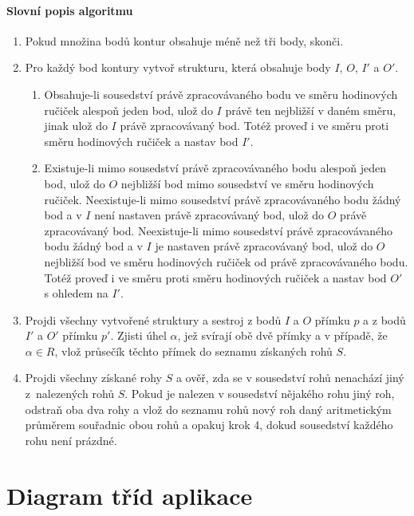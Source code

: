 \subsubsection{Slovní popis algoritmu}
\begin{enumerate}
  \item Pokud množina bodů kontur obsahuje méně než tři body, skonči.
  \item Pro každý bod kontury vytvoř strukturu, která obsahuje body $I$, $O$,
  $I'$ a $O'$.
	\begin{enumerate}
	  \item Obsahuje-li sousedství právě zpracovávaného bodu ve směru hodinových 
	  ručiček alespoň jeden bod, ulož do $I$ právě ten nejbližší v daném směru, 
	  jinak ulož do $I$ právě zpracovávaný bod. Totéž proveď i ve směru proti 
	  směru hodinových ručiček a nastav bod $I'$.
	  \item Existuje-li mimo sousedství právě zpracovávaného bodu alespoň jeden
	  bod, ulož do $O$ nejbližší bod mimo sousedství ve směru hodinových ručiček.
	  Neexistuje-li mimo sousedství právě zpracovávaného bodu žádný bod a v $I$
	  není nastaven právě zpracovávaný bod, ulož do $O$ právě zpracovávaný bod.
	  Neexistuje-li mimo sousedství právě zpracovávaného bodu žádný bod a v $I$
	  je nastaven právě zpracovávaný bod, ulož do $O$ nejbližší bod ve směru
	  hodinových ručiček od právě zpracovávaného bodu. Totéž proveď i ve směru
	  proti směru hodinových ručiček a nastav bod $O'$ s ohledem na $I'$.
	\end{enumerate}
  \item Projdi všechny vytvořené struktury a sestroj z bodů $I$ a $O$ přímku $p$
  a z bodů $I'$ a $O'$ přímku $p'$. Zjisti úhel $\alpha$, jež svírají obě dvě
  přímky a v případě, že $\alpha \in R$, vlož průsečík těchto přímek do seznamu
  získaných rohů $S$.
  \item Projdi všechny získané rohy $S$ a ověř, zda se v sousedství rohů
  nenachází jiný z~nalezených rohů $S$. Pokud je nalezen v sousedství nějakého
  rohu jiný roh, odstraň oba dva rohy a vlož do seznamu rohů nový roh daný aritmetickým
  průměrem souřadnic obou rohů a opakuj krok 4, dokud sousedství každého rohu
  není prázdné. 
\end{enumerate}

\chapter{Diagram tříd aplikace}
\label{diagramTrid}


